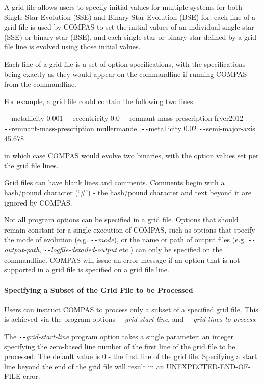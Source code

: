 A grid file allows users to specify initial values for multiple systems for both Single Star Evolution (SSE) and Binary Star Evolution (BSE) for: each line of a grid file is used by COMPAS to set the initial values of an individual single star (SSE) or binary star (BSE), and each single star or binary star defined by a grid file line is evolved using those initial values.

Each line of a grid file is a set of option specifications, with the specifications being exactly as they would appear on the commandline if running COMPAS from the commandline.

For example, a grid file could contain the following two lines:

\tabto{3em}\texttt{-{}-}metallicity 0.001 \texttt{-{}-}eccentricity 0.0 \texttt{-{}-}remnant-mass-prescription fryer2012\\
\tabto{3em}\texttt{-{}-}remnant-mass-prescription mullermandel \texttt{-{}-}metallicity 0.02 \texttt{-{}-}semi-major-axis 45.678

in which case COMPAS would evolve two binaries, with the option values set per the grid file lines.

\bigskip
Grid files can have blank lines and comments.  Comments begin with a hash/pound character (‘\#’) - the hash/pound character and text beyond it are ignored by COMPAS.

Not all program options can be specified in a grid file.  Options that should remain constant for a single execution of COMPAS, such as options that specify the mode of evolution (e.g. \texttt{-{}-}\textit{mode}), or the name or path of output files (e.g. \texttt{-{}-}\textit{output-path}, \texttt{-{}-}\textit{logfile-detailed-output} etc.) can only be specified on the commandline. COMPAS will issue an error message if an option that is not supported in a grid file is specified on a grid file line.

\paragraph{Specifying a Subset of the Grid File to be Processed}\label{sec:GridFileSubset}\mbox{}

Users can instruct COMPAS to process only a subset of a specified grid file.  This is achieved via the program options \texttt{-{}-}\textit{grid-start-line}, and \texttt{-{}-}\textit{grid-lines-to-process}:

The \texttt{-{}-}\textit{grid-start-line} program option takes a single parameter: an integer specifying the zero-based line number of the first line of the grid file to be processed.  The default value is 0 - the first line of the grid file.  Specifying a start line beyond the end of the grid file will result in an UNEXPECTED-END-OF-FILE error.

